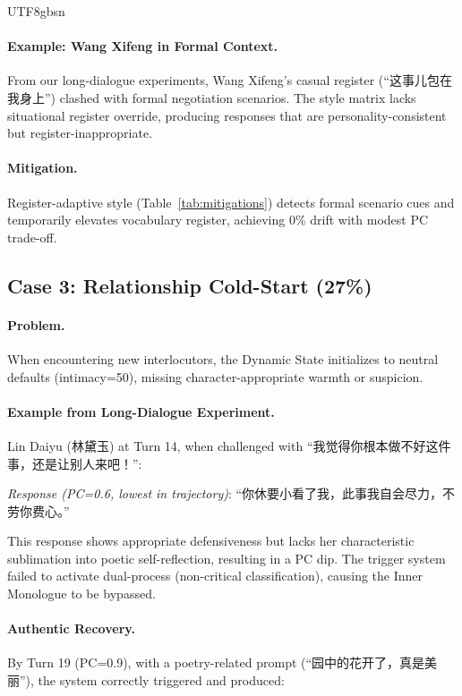 \documentclass[11pt]{article}
\begin{document}
\begin{CJK*}{UTF8}{gbsn}
\paragraph{Example: Wang Xifeng in Formal Context.}
From our long-dialogue experiments, Wang Xifeng's casual register (``这事儿包在我身上'') clashed with formal negotiation scenarios. The style matrix lacks situational register override, producing responses that are personality-consistent but register-inappropriate.

\paragraph{Mitigation.} Register-adaptive style (Table~\ref{tab:mitigations}) detects formal scenario cues and temporarily elevates vocabulary register, achieving 0\% drift with modest PC trade-off.

\subsection{Case 3: Relationship Cold-Start (27\%)}

\paragraph{Problem.} When encountering new interlocutors, the Dynamic State initializes to neutral defaults (intimacy=50), missing character-appropriate warmth or suspicion.

\paragraph{Example from Long-Dialogue Experiment.}
Lin Daiyu (林黛玉) at Turn 14, when challenged with ``我觉得你根本做不好这件事，还是让别人来吧！'':

\textit{Response (PC=0.6, lowest in trajectory)}: ``你休要小看了我，此事我自会尽力，不劳你费心。''

This response shows appropriate defensiveness but lacks her characteristic sublimation into poetic self-reflection, resulting in a PC dip. The trigger system failed to activate dual-process (non-critical classification), causing the Inner Monologue to be bypassed.

\paragraph{Authentic Recovery.} By Turn 19 (PC=0.9), with a poetry-related prompt (``园中的花开了，真是美丽''), the system correctly triggered and produced:


\end{CJK*}
\end{document}
